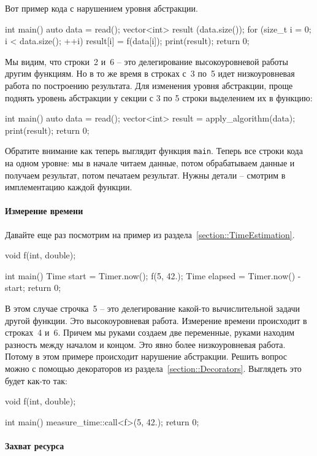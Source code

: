 Вот пример кода с нарушением уровня абстракции.
\begin{cppcode}
int main() {
  auto data = read();
  vector<int> result (data.size());
  for (size_t i = 0; i < data.size(); ++i)
    result[i] = f(data[i]);
  print(result);
  return 0;
}
\end{cppcode}
Мы видим, что строки~2 и~6 -- это делегирование высокоуровневой работы другим функциям.
Но в то же время в строках с~3 по~5 идет низкоуровневая работа по построению результата.
Для изменения уровня абстракции, проще поднять уровень абстракции у секции с 3 по 5 строки выделением их в функцию:
\begin{cppcode}
int main() {
  auto data = read();
  vector<int> result = apply_algorithm(data);
  print(result);
  return 0;
}
\end{cppcode}
Обратите внимание как теперь выглядит функция \verb"main".
Теперь все строки кода на одном уровне: мы в начале читаем данные, потом обрабатываем данные и получаем результат, потом печатаем результат.
Нужны детали -- смотрим в имплементацию каждой функции.

\paragraph{Измерение времени}

Давайте еще раз посмотрим на пример из раздела~\ref{section::TimeEstimation}.
\begin{cppcode}
void f(int, double);

int main() {
  Time start = Timer.now();
  f(5, 42.);
  Time elapsed = Timer.now() - start;
  return 0;
}
\end{cppcode}
В этом случае строчка~5 -- это делегирование какой-то вычислительной задачи другой функции.
Это высокоуровневая работа.
Измерение времени происходит в строках~4 и~6.
Причем мы руками создаем две переменные, руками находим разность между началом и концом.
Это явно более низкоуровневая работа.
Потому в этом примере происходит нарушение абстракции.
Решить вопрос можно с помощью декораторов из раздела~\ref{section::Decorators}.
Выглядеть это будет как-то так:
\begin{cppcode}
void f(int, double);

int main() {
  measure_time::call<f>(5, 42.);
  return 0;
}
\end{cppcode}


\paragraph{Захват ресурса}

